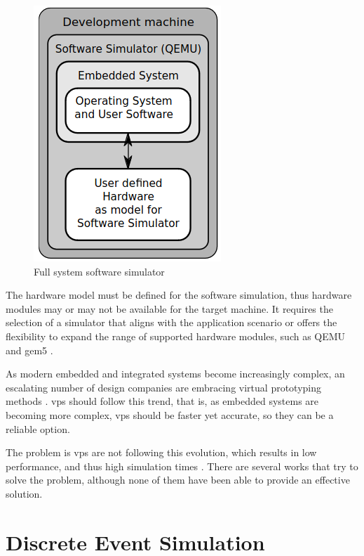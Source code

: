 \begin{figure}[H]
	\centering
 	\includegraphics[width=0.3\linewidth]{Images/FSSsoftware.png}
 	\caption{Full system software simulator \cite{TypesOfFSS}}
	 \label{fig_FSSsoftware}
\end{figure}

The hardware model must be defined for the software simulation, thus hardware modules may or may not be available for the target machine. It requires the selection of a simulator that aligns with the application scenario or offers the flexibility to expand the range of supported hardware modules, such as QEMU \cite{theQEMUsimulator} and gem5 \cite{TheGem5Simulator}.

As modern embedded and integrated systems become increasingly complex, an escalating number of design companies are embracing virtual prototyping methods \cite{UltraFastVPs}. \Glspl{vp} should follow this trend, that is, as embedded systems are becoming more complex, \glspl{vp} should be faster yet accurate, so they can be a reliable option.

The problem is \glspl{vp} are not following this evolution, which results in low performance, and thus high simulation times \cite{pargem5} \cite{UltraFastVPs} \cite{optimizingTD}. There are several works that try to solve the problem, although none of them have been able to provide an effective solution.

 

\section{Discrete Event Simulation}



